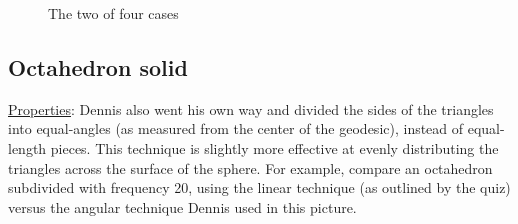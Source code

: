 \begin{center}
\begin{figure}[h]
\hfill
{}
\caption{The two of four cases}
\label{fig:TetraPathFiding}
\end{figure}
\end{center}
\clearpage
\newpage
\subsection{Octahedron solid}
\noindent\uline{Properties}: 
Dennis also went his own way and divided the sides of the triangles into equal-angles (as measured from the center of the geodesic), instead of equal-length pieces. This technique is slightly more effective at evenly distributing the triangles across the surface of the sphere. For example, compare an octahedron subdivided with frequency 20, using the linear technique (as outlined by the quiz) versus the angular technique Dennis used in this picture. 

